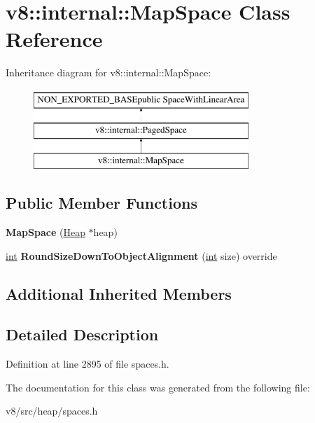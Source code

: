 \hypertarget{classv8_1_1internal_1_1MapSpace}{}\section{v8\+:\+:internal\+:\+:Map\+Space Class Reference}
\label{classv8_1_1internal_1_1MapSpace}
Inheritance diagram for v8\+:\+:internal\+:\+:Map\+Space\+:\begin{figure}[H]
\begin{center}
\leavevmode
\includegraphics[height=3.000000cm]{classv8_1_1internal_1_1MapSpace}
\end{center}
\end{figure}
\subsection*{Public Member Functions}
\begin{DoxyCompactItemize}
\item 
\mbox{\label{classv8_1_1internal_1_1MapSpace_aaa23fd6a0e8debcbd354ef35e9c4e005}} 
{\bfseries Map\+Space} (\mbox{\hyperlink{classv8_1_1internal_1_1Heap}{Heap}} $\ast$heap)
\item 
\mbox{\label{classv8_1_1internal_1_1MapSpace_abc9c7d7504939f00719a37aea625e5d6}} 
\mbox{\hyperlink{classint}{int}} {\bfseries Round\+Size\+Down\+To\+Object\+Alignment} (\mbox{\hyperlink{classint}{int}} size) override
\end{DoxyCompactItemize}
\subsection*{Additional Inherited Members}


\subsection{Detailed Description}


Definition at line 2895 of file spaces.\+h.



The documentation for this class was generated from the following file\+:\begin{DoxyCompactItemize}
\item 
v8/src/heap/spaces.\+h\end{DoxyCompactItemize}
